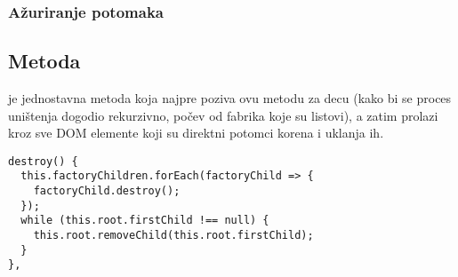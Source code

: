 \subsubsection{Ažuriranje potomaka}

\subsection{Metoda }

 je jednostavna metoda koja najpre poziva ovu metodu za decu (kako bi se proces uništenja dogodio rekurzivno, počev od fabrika koje su listovi), a zatim prolazi kroz sve DOM elemente koji su direktni potomci korena i uklanja ih.

\begin{lstlisting}
destroy() {
  this.factoryChildren.forEach(factoryChild => {
    factoryChild.destroy();
  });
  while (this.root.firstChild !== null) {
    this.root.removeChild(this.root.firstChild);
  }
},
\end{lstlisting}
